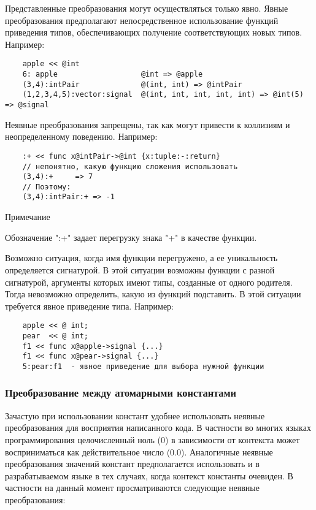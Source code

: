 {Представленные преобразования могут осуществляться только явно. Явные преобразования предполагают непосредственное использование функций приведения типов, обеспечивающих получение соответствующих новых типов. Например:

\begin{verbatim}
    apple << @int
    6: apple                   @int => @apple
    (3,4):intPair              @(int, int) => @intPair
    (1,2,3,4,5):vector:signal  @(int, int, int, int, int) => @int(5) => @signal
\end{verbatim}

Неявные преобразования запрещены, так как могут привести к коллизиям и неопределенному поведению. Например:

\begin{verbatim}
    :+ << func x@intPair->@int {x:tuple:-:return}
    // непонятно, какую функцию сложения использовать
    (3,4):+     => 7
    // Поэтому:
    (3,4):intPair:+ => -1
\end{verbatim}

Примечание

Обозначение ":+" задает перегрузку знака "+" в качестве функции.

Возможно ситуация, когда имя функции перегружено, а ее уникальность определяется сигнатурой. В этой ситуации возможны функции с разной сигнатурой, аргументы которых имеют типы, созданные от одного родителя. Тогда невозможно определить, какую из функций подставить. В этой ситуации требуется явное приведение типа. Например:

\begin{verbatim}
    apple << @ int;
    pear  << @ int;
    f1 << func x@apple->signal {...}
    f1 << func x@pear->signal {...}
    5:pear:f1  - явное приведение для выбора нужной функции
\end{verbatim}

\subsubsection{Преобразование между атомарными константами}

Зачастую при использовании констант удобнее использовать неявные преобразования для восприятия написанного кода. В частности во многих языках программирования целочисленный ноль (0) в зависимости от контекста может восприниматься как действительное число (0.0). Аналогичные неявные преобразования значений констант предполагается использовать и в разрабатываемом языке в тех случаях, когда контекст константы очевиден. В частности на данный момент просматриваются следующие неявные преобразования:

}

